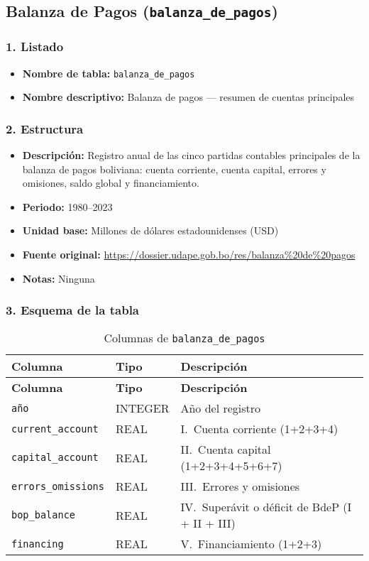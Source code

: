 \documentclass[12pt,a4paper]{article}
\begin{document}
\subsection{Balanza de Pagos (\texttt{balanza\_de\_pagos})}

\subsubsection*{1. Listado}
\begin{itemize}
  \item \textbf{Nombre de tabla:} \texttt{balanza\_de\_pagos}
  \item \textbf{Nombre descriptivo:} Balanza de pagos — resumen de cuentas principales
\end{itemize}

\subsubsection*{2. Estructura}
\begin{itemize}
  \item \textbf{Descripción:} Registro anual de las cinco partidas contables principales de la balanza de pagos boliviana: cuenta corriente, cuenta capital, errores y omisiones, saldo global y financiamiento.
  \item \textbf{Periodo:} 1980--2023
  \item \textbf{Unidad base:} Millones de dólares estadounidenses (USD)
  \item \textbf{Fuente original:} \url{https://dossier.udape.gob.bo/res/balanza\%20de\%20pagos}
  \item \textbf{Notas:} Ninguna
\end{itemize}

\subsubsection*{3. Esquema de la tabla}
\begin{longtable}{@{}lll@{}}
\caption{Columnas de \texttt{balanza\_de\_pagos}}\\
\toprule
\textbf{Columna} & \textbf{Tipo} & \textbf{Descripción} \\
\midrule
\endfirsthead
\toprule
\textbf{Columna} & \textbf{Tipo} & \textbf{Descripción} \\
\midrule
\endhead
\bottomrule
\endfoot
\texttt{año}                & INTEGER & Año del registro \\
\texttt{current\_account}   & REAL    & I.\ Cuenta corriente (1+2+3+4) \\
\texttt{capital\_account}   & REAL    & II.\ Cuenta capital (1+2+3+4+5+6+7) \\
\texttt{errors\_omissions}  & REAL    & III.\ Errores y omisiones \\
\texttt{bop\_balance}       & REAL    & IV.\ Superávit o déficit de BdeP (I + II + III) \\
\texttt{financing}          & REAL    & V.\ Financiamiento (1+2+3) \\
\end{longtable}
\end{document}
